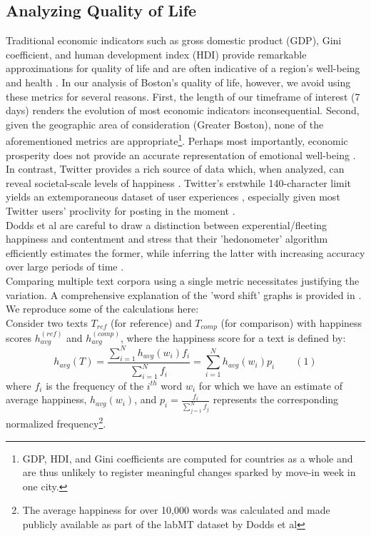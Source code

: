 \documentclass[journal, a4paper]{IEEEtran}
\begin{document}
\subsection{Analyzing Quality of Life}
Traditional economic indicators such as gross domestic product (GDP), Gini coefficient, and human development index (HDI) provide remarkable approximations for quality of life and are often indicative of a region's well-being and health \cite{gallup}\cite{wellbgallup}. In our analysis of Boston's quality of life, however, we avoid using these metrics for several reasons. First, the length of our timeframe of interest (7 days) renders the evolution of most economic indicators inconsequential. Second, given the geographic area of consideration (Greater Boston), none of the aforementioned metrics are appropriate\footnote{GDP, HDI, and Gini coefficients are computed for countries as a whole and are thus unlikely to register meaningful changes sparked by move-in week in one city.}. Perhaps most importantly, economic prosperity does not provide an accurate representation of emotional well-being \cite{wellbgallup}. 
\\In contrast, Twitter provides a rich source of data which, when analyzed, can reveal societal-scale levels of happiness \cite{happytexttwitter}. Twitter's erstwhile 140-character limit yields an extemporaneous dataset of user experiences \cite{moralsc}, especially given most Twitter users' proclivity for posting in the moment \cite{twtrends}\cite{mtwtrends}.
\\Dodds et al are careful to draw a distinction between experential/fleeting happiness and contentment and stress that their 'hedonometer' algorithm efficiently estimates the former, while inferring the latter with increasing accuracy over large periods of time \cite{happytext}.
\\Comparing multiple text corpora using a single metric necessitates justifying the variation. A comprehensive explanation of the 'word shift' graphs is provided in \cite{happytext}. We reproduce some of the calculations here:
\\Consider two texts $T_{ref}$ (for reference) and $T_{comp}$ (for comparison) with happiness scores $h_{avg}^{(ref)}$ and $h_{avg}^{(comp)}$, where the happiness score for a text is defined by:
\[h_{avg}(T) = \frac{\sum_{i=1}^{N}h_{avg}(w_{i})f_{i}}{\sum_{i=1}^{N}f_{i}} = \sum_{i=1}^{N}h_{avg}(w_i)p_i \quad\quad (1)\] where $f_i$ is the frequency of the $i^{th}$ word $w_i$ for which we have an estimate of average happiness, $h_{avg}(w_i)$, and $p_i = \frac{f_i}{\sum_{j=1}^{N}f_j}$ represents the corresponding normalized frequency\footnote{The average happiness for over 10,000 words was calculated and made publicly available as part of the labMT dataset by Dodds et al}.
\end{document}
